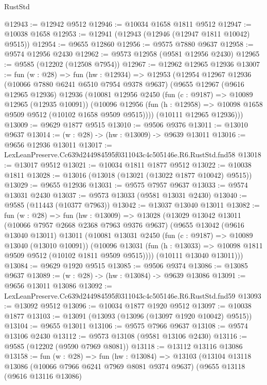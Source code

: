 \begin{lexlean}{RustStd}
\begin{coremodule}
@12943 := @12942 @9512
@12946 := @10034 @1658 @1811 @9512
@12947 := @10038 @1658
@12953 := @12941 (@12943 (@12946 (@12947 @1811 @10042) @9515))
@12954 := @9655 @12860
@12956 := @9575 @7880 @9637
@12958 := @9574 @12956 @2430
@12962 := @9573 @12958 (@9581 @12956 @2430)
@12965 := @9585 (@12202 (@12508 @7954))
@12967 := @12962 @12965 @12936
@13007 := fun (w : @28) =>
  fun (hw : @12934) =>
  @12953
    (@12954
      @12967
      @12936
      (@10066 @7880 @6241 @6510 @7954 @9378 @9637)
      (@9655
        @12967
        (@9616 @12965 @12936)
        @12936
        (@10081
          @12956
          @2450
          (fun (c : @9187) => @10089 @12965 (@12935 @10091))
          (@10096 @12956 (fun (h : @12958) => @10098 @1658 @9509 @9512 (@10102 @1658 @9509 @9515))))
        (@10111 @12965 @12936)))
@13009 := @9629 @1877 @9515
@13010 := @9506 @9376
@13011 := @13010 @9637
@13014 := (w : @28) -> (hw : @13009) -> @9639 @13011
@13016 := @9656 @12936 @13011
@13017 := LexLeanPreserve.Cc639d244984595f0311043c4c505146e.R6.RustStd.fnd58
@13018 := @13017 @9512
@13021 := @10034 @1811 @1877 @9512
@13022 := @10038 @1811
@13028 := @13016 (@13018 (@13021 (@13022 @1877 @10042) @9515))
@13029 := @9655 @12936
@13031 := @9575 @7957 @9637
@13033 := @9574 @13031 @2430
@13037 := @9573 @13033 (@9581 @13031 @2430)
@13040 := @9585 (@11443 (@10377 @7963))
@13042 := @13037 @13040 @13011
@13082 := fun (w : @28) =>
  fun (hw : @13009) =>
  @13028
    (@13029
      @13042
      @13011
      (@10066 @7957 @2668 @2368 @7963 @9376 @9637)
      (@9655
        @13042
        (@9616 @13040 @13011)
        @13011
        (@10081
          @13031
          @2450
          (fun (c : @9187) => @10089 @13040 (@13010 @10091))
          (@10096 @13031 (fun (h : @13033) => @10098 @1811 @9509 @9512 (@10102 @1811 @9509 @9515))))
        (@10111 @13040 @13011)))
@13084 := @9629 @1920 @9515
@13085 := @9506 @9374
@13086 := @13085 @9637
@13089 := (w : @28) -> (hw : @13084) -> @9639 @13086
@13091 := @9656 @13011 @13086
@13092 := LexLeanPreserve.Cc639d244984595f0311043c4c505146e.R6.RustStd.fnd59
@13093 := @13092 @9512
@13096 := @10034 @1877 @1920 @9512
@13097 := @10038 @1877
@13103 := @13091 (@13093 (@13096 (@13097 @1920 @10042) @9515))
@13104 := @9655 @13011
@13106 := @9575 @7966 @9637
@13108 := @9574 @13106 @2430
@13112 := @9573 @13108 (@9581 @13106 @2430)
@13116 := @9585 (@12202 (@9590 @7969 @8081))
@13118 := @13112 @13116 @13086
@13158 := fun (w : @28) =>
  fun (hw : @13084) =>
  @13103
    (@13104
      @13118
      @13086
      (@10066 @7966 @6241 @7969 @8081 @9374 @9637)
      (@9655
        @13118
        (@9616 @13116 @13086)

\end{coremodule}
\end{lexlean}
